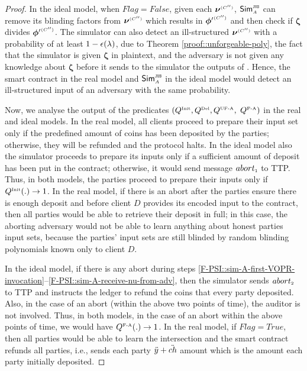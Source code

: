 \begin{proof}
In the ideal model, when $Flag=False$, given each $ {\bm\nu}^{ \scriptscriptstyle {  {(C'')}} }$, $\mathsf{Sim}^{\scriptscriptstyle \mathtt{JUS}}_{\scriptscriptstyle A}$ can remove its blinding factors from  $ {\bm\nu}^{ \scriptscriptstyle {  {(C'')}} }$ which results in $ {\bm\phi'}^{ \scriptscriptstyle {  {(C'')}} }$ and then check if $ {\bm\zeta}$  divides $ {\bm\phi'}^{ \scriptscriptstyle {  {(C'')}} }$. The simulator can also detect an ill-structured  $ {\bm\nu}^{ \scriptscriptstyle {  {(C'')}} }$ with a probability of at least $1-\epsilon(\lambda)$, due to Theorem \ref{proof::unforgeable-poly}, the fact that the simulator is given $ {\bm \zeta}$ in plaintext,  and the adversary is not given any knowledge about $ {\bm \zeta}$ before it sends to the simulator the outputs of \vopr.  Hence, the smart contract in the real model and $\mathsf{Sim}^{\scriptscriptstyle \mathtt{JUS}}_{\scriptscriptstyle A}$ in the ideal model would detect an ill-structured input of an adversary with the same probability. 



Now, we analyse the output of the predicates $(Q^{\scriptscriptstyle \text{Init}}, Q^{\scriptscriptstyle \text{Del}}, Q^{\scriptscriptstyle \text{UF-A}}, $ $Q^{\scriptscriptstyle \text{F-A}})$ in the real and ideal models. In the real model, all clients proceed to prepare their input set only if the predefined amount of coins has been deposited by the parties; otherwise, they will be refunded and the protocol halts. In the ideal model also the simulator proceeds to prepare its inputs only if a sufficient amount of deposit has been put in the contract; otherwise, it would send message $abort_{\scriptscriptstyle 1}$ to TTP. Thus, in both models, the parties proceed to prepare their inputs only if $Q^{\scriptscriptstyle \text{Init}}(.) \rightarrow1$. 
%
In the real model, if there is an abort after the parties ensure there is enough deposit and before client $D$ provides its encoded input to the contract, then all parties would be able to retrieve their deposit in full; in this case, the aborting adversary would not be able to learn anything about honest parties input sets, because the parties' input sets are still blinded by random blinding polynomials known only to client $D$. 

In the ideal model, if there is any abort during steps \ref{F-PSI::sim-A-first-VOPR-invocation}--\ref{F-PSI::sim-A-receive-nu-from-adv}, then the simulator sends $abort_{\scriptscriptstyle 2}$ to TTP and instructs the ledger to refund the coins that every party deposited. Also, in the case of an abort (within the above two points of time), the auditor is not involved. Thus, in both models,  in the case of an abort within the above points of time, we would have $Q^{\scriptscriptstyle \text{F-A}}(.)\rightarrow1$. In the real model, if $Flag=True$, then all parties would be able to learn the intersection and the smart contract refunds all parties, i.e., sends each party $\ddot{y}+\ddot{ch}$ amount which is the amount each party initially deposited. 


\end{proof}
